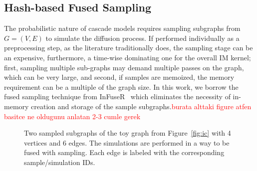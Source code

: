 \documentclass[10pt,journal,compsoc]{IEEEtran}
\newcommand\kktodo[1]{\textcolor{red}{#1}}
\begin{document}
\subsection{Hash-based Fused Sampling}
The probabilistic nature of cascade models requires sampling subgraphs from $G = (V, E)$ to simulate the diffusion process. If performed individually as a preprocessing step, as the literature traditionally does, the sampling stage can be an expensive, furthermore, a time-wise dominating one for the overall IM kernel; first, sampling multiple sub-graphs may demand multiple passes on the graph, which can be very large, and second, if samples are memoized, the memory requirement can be a multiple of the graph size. 
In this work, we borrow the fused sampling technique from {\sc InFuseR}~\cite{infuser} which eliminates the necessity of in-memory creation and storage of the sample subgraphs.\kktodo{burata alttaki figure atfen basitce ne oldugunu anlatan 2-3 cumle gerek}

\begin{figure}[!ht] 
    \centering
  \caption{
  \protect{} Two sampled subgraphs of the toy graph from Figure~\ref{fig:ic} with 4 vertices and 6 edges.
  \protect{} The simulations are performed in a way to be fused with sampling. Each edge is labeled with the corresponding sample/simulation IDs. 
  }
  \label{fig:traversal} 
\end{figure}
\end{document}
